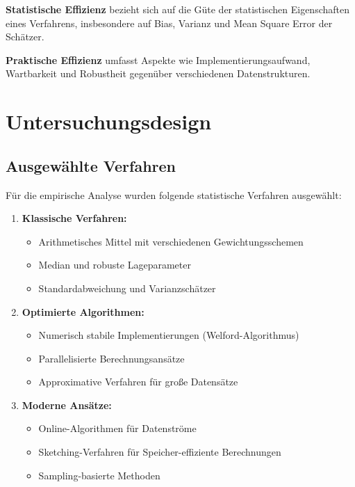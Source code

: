 \documentclass[
  ngerman,
  10pt,
  letterpaper,
]{book}
\providecommand{\tightlist}{%
  \setlength{\itemsep}{0pt}\setlength{\parskip}{0pt}}
\begin{document}
\textbf{Statistische Effizienz} bezieht sich auf die Güte der
statistischen Eigenschaften eines Verfahrens, insbesondere auf Bias,
Varianz und Mean Square Error der Schätzer.

\textbf{Praktische Effizienz} umfasst Aspekte wie
Implementierungsaufwand, Wartbarkeit und Robustheit gegenüber
verschiedenen Datenstrukturen.

\section{Untersuchungsdesign}\label{untersuchungsdesign}

\subsection{Ausgewählte Verfahren}\label{ausgewuxe4hlte-verfahren}

Für die empirische Analyse wurden folgende statistische Verfahren
ausgewählt:

\begin{enumerate}
\def\labelenumi{\arabic{enumi}.}
\tightlist
\item
  \textbf{Klassische Verfahren:}

  \begin{itemize}
  \tightlist
  \item
    Arithmetisches Mittel mit verschiedenen Gewichtungsschemen
  \item
    Median und robuste Lageparameter
  \item
    Standardabweichung und Varianzschätzer
  \end{itemize}
\item
  \textbf{Optimierte Algorithmen:}

  \begin{itemize}
  \tightlist
  \item
    Numerisch stabile Implementierungen (Welford-Algorithmus)
  \item
    Parallelisierte Berechnungsansätze
  \item
    Approximative Verfahren für große Datensätze
  \end{itemize}
\item
  \textbf{Moderne Ansätze:}

  \begin{itemize}
  \tightlist
  \item
    Online-Algorithmen für Datenströme
  \item
    Sketching-Verfahren für Speicher-effiziente Berechnungen
  \item
    Sampling-basierte Methoden
  \end{itemize}
\end{enumerate}
\end{document}
